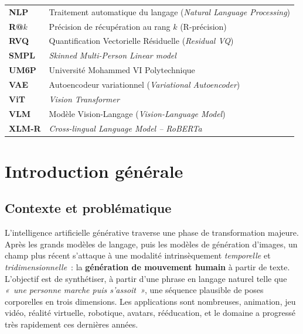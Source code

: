 \documentclass[12pt,a4paper,oneside]{report}
\theoremstyle{definition}
\theoremstyle{plain}
\begin{document}
\begin{longtable}{@{}p{2.4cm}p{12cm}@{}}
\textbf{NLP} & Traitement automatique du langage (\emph{Natural Language Processing}) \\
\textbf{R@$k$} & Précision de récupération au rang $k$ (R-précision) \\
\textbf{RVQ} & Quantification Vectorielle Résiduelle (\emph{Residual VQ}) \\
\textbf{SMPL} & \emph{Skinned Multi-Person Linear model} \\
\textbf{UM6P} & Université Mohammed VI Polytechnique \\
\textbf{VAE} & Autoencodeur variationnel (\emph{Variational Autoencoder}) \\
\textbf{ViT} & \emph{Vision Transformer} \\
\textbf{VLM} & Modèle Vision-Langage (\emph{Vision-Language Model}) \\
\textbf{XLM-R} & \emph{Cross-lingual Language Model -- RoBERTa} \\
\end{longtable}
\endgroup

\tableofcontents
\listoffigures
\listoftables

\cleardoublepage
{}

\chapter*{Introduction générale}

\section*{Contexte et problématique}

L'intelligence artificielle générative traverse une phase de transformation
majeure. Après les grands modèles de langage, puis les modèles de génération
d'images, un champ plus récent s'attaque à une modalité intrinsèquement
\emph{temporelle} et \emph{tridimensionnelle}~: la \textbf{génération de
mouvement humain} à partir de texte. L'objectif est de synthétiser, à partir
d'une phrase en langage naturel telle que \emph{«~une personne marche puis
s'assoit~»}, une séquence plausible de poses corporelles en trois dimensions.
Les applications sont nombreuses, animation, jeu vidéo, réalité virtuelle,
robotique, avatars, rééducation, et le domaine a progressé très rapidement
ces dernières années.
\end{document}
